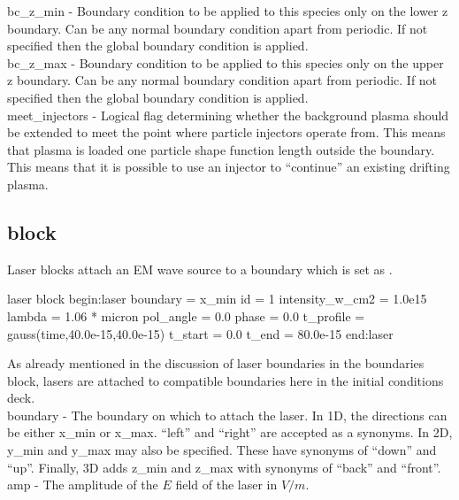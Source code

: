 {\emphtext bc\_z\_min} - Boundary condition to be applied to this species only
on the lower z boundary. Can be any normal boundary condition apart
from periodic. If not specified then the global boundary condition is applied.\\

{\emphtext bc\_z\_max} - Boundary condition to be applied to this species only
on the upper z boundary. Can be any normal boundary condition apart
from periodic. If not specified then the global boundary condition is applied.\\

{\emphtext meet\_injectors} - Logical flag determining whether the background
plasma
should be extended to meet the point where particle injectors operate from.
This means that plasma is loaded one particle shape function length outside the
boundary. This means that it is possible to use an injector to ``continue'' an
existing drifting plasma. 


\subsection{ block}
\label{sec:laser_block}
Laser blocks attach an EM wave source to a boundary which is set as
.
\begin{lboxverbatim}{laser block}
begin:laser
   boundary = x_min
   id = 1
   intensity_w_cm2 = 1.0e15
   lambda = 1.06 * micron
   pol_angle = 0.0
   phase = 0.0
   t_profile = gauss(time,40.0e-15,40.0e-15)
   t_start = 0.0
   t_end = 80.0e-15
end:laser
\end{lboxverbatim}

As already mentioned in the discussion of laser boundaries in the boundaries
block, lasers are attached to compatible boundaries here in the initial
conditions deck.\\

{\emphtext boundary} - The boundary on which to attach the laser.
  In 1D, the directions can be either x\_min or x\_max.  ``left'' and ``right''
  are accepted as a synonyms. In 2D, y\_min and y\_max may also be specified.
  These have synonyms of ``down'' and ``up''. Finally, 3D adds z\_min and z\_max
  with synonyms of ``back'' and ``front''.\\

{\emphtext amp} - The amplitude of the $E$ field of the laser in $V/m$.\\

